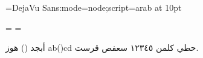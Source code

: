 


\font\aaa={DejaVu Sans:mode=node;script=arab} at 10pt\aaa

\showboxdepth=\maxdimen
\showboxbreadth=\maxdimen



أبجد () هوز ab()cd حطي كلمن ١٢٣٤٥ سعفص قرست.
\bye
